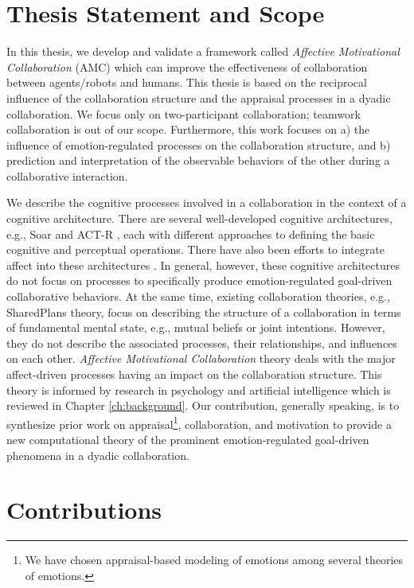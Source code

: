 \documentclass[12pt]{report}
\begin{document}
\section{Thesis Statement and Scope}

In this thesis, we develop and validate a framework called \textit{Affective
Motivational Collaboration} (AMC) which can improve the effectiveness of
collaboration between agents/robots and humans. This thesis is based on the
reciprocal influence of the collaboration structure and the appraisal processes
in a dyadic collaboration. We focus only on two-participant collaboration; teamwork
collaboration is out of our scope. Furthermore, this work focuses on a) the
influence of emotion-regulated processes on the collaboration structure, and b)
prediction and interpretation of the observable behaviors of the other during a
collaborative interaction.

We describe the cognitive processes involved in a collaboration in the context
of a cognitive architecture. There are several well-developed cognitive
architectures, e.g., Soar \cite{laird:soar} and ACT-R \cite{anderson:act-r},
each with different approaches to defining the basic cognitive and perceptual
operations. There have also been efforts to integrate affect into these
architectures \cite{dancy:actR-physiology-affect, marinier:behavior-emotion}. In
general, however, these cognitive architectures do not focus on processes to
specifically produce emotion-regulated goal-driven collaborative behaviors. At
the same time, existing collaboration theories, e.g., SharedPlans
\cite{grosz:plans-discourse} theory, focus on describing the structure of a
collaboration in terms of fundamental mental state, e.g., mutual beliefs or
joint intentions. However, they do not describe the associated processes, their
relationships, and influences on each other. \textit{Affective Motivational
Collaboration} theory deals with the major affect-driven processes having an
impact on the collaboration structure. This theory is informed by research in
psychology and artificial intelligence which is reviewed in Chapter
\ref{ch:background}. Our contribution, generally speaking, is to synthesize
prior work on appraisal\footnote{We have chosen appraisal-based modeling of
emotions among several theories of emotions.}, collaboration, and motivation to
provide a new computational theory of the prominent emotion-regulated
goal-driven phenomena in a dyadic collaboration.

\section{Contributions}
\end{document}
